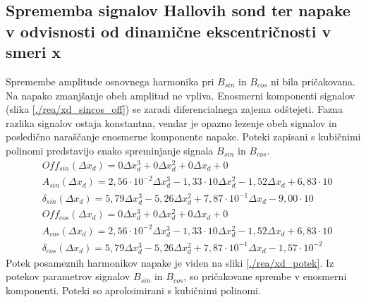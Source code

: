 \subsection{Sprememba signalov Hallovih sond ter napake v odvisnosti od dinamične ekscentričnosti v smeri x}
Spremembe amplitude osnovnega harmonika pri $B_{sin}$ in $B_{cos}$ ni bila pričakovana. Na napako zmanjšanje obeh amplitud ne vpliva. Enosmerni komponenti signalov (slika \ref{./rea/xd_sincos_off}) se zaradi diferencialnega zajema odštejeti. Fazna razlika signalov ostaja konstantna, vendar je opazno lezenje obeh signalov in posledično naraščanje enosmerne komponente napake.
Poteki zapisani s kubičnimi polinomi predstavijo enako spreminjanje signala $B_{sin}$ in $B_{cos}$.
\begin{eqnarray}
&Off_{sin}(\Delta x_d) =0\Delta x_d^{3}+0\Delta x_d^{2}+0\Delta x_d+0 \\
&A_{sin}(\Delta x_d) =2,56\cdot 10^{-2}\Delta x_d^{3}-1,33\cdot 10\Delta x_d^{2}-1,52\Delta x_d+6,83\cdot 10 \\                          
&\delta_{sin}(\Delta x_d) =5,79\Delta x_d^{3}-5,26\Delta x_d^{2}+7,87\cdot 10^{-1}\Delta x_d-9,00\cdot 10 \\                             
&Off_{cos}(\Delta x_d) =0\Delta x_d^{3}+0\Delta x_d^{2}+0\Delta x_d+0 \\
&A_{cos}(\Delta x_d) =2,56\cdot 10^{-2}\Delta x_d^{3}-1,33\cdot 10\Delta x_d^{2}-1,52\Delta x_d+6,83\cdot 10 \\                          
&\delta_{cos}(\Delta x_d) =5,79\Delta x_d^{3}-5,26\Delta x_d^{2}+7,87\cdot 10^{-1}\Delta x_d-1,57\cdot 10^{-2}
\end{eqnarray}
Potek posameznih harmonikov napake je viden na sliki \ref{./rea/xd_potek}. Iz potekov parametrov signalov $B_{sin}$ in $B_{cos}$, so pričakovane sprembe v enosmerni komponenti.  Poteki so aproksimirani s kubičnimi polinomi.
